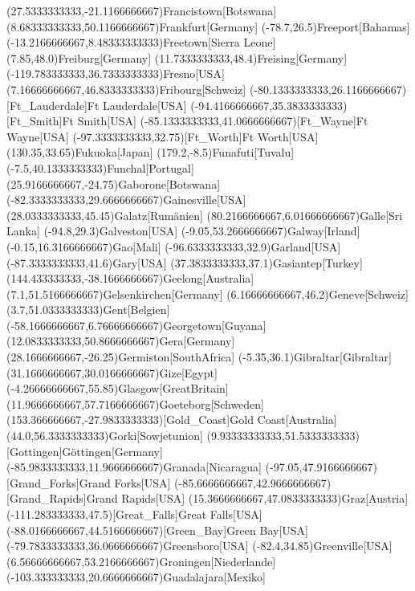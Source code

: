 \mapput(27.5333333333,-21.1166666667){Francistown}[Botswana]
\mapput(8.68333333333,50.1166666667){Frankfurt}[Germany]
\mapput(-78.7,26.5){Freeport}[Bahamas]
\mapput(-13.2166666667,8.48333333333){Freetown}[Sierra Leone]
\mapput(7.85,48.0){Freiburg}[Germany]
\mapput(11.7333333333,48.4){Freising}[Germany]
\mapput(-119.783333333,36.7333333333){Fresno}[USA]
\mapput(7.16666666667,46.8333333333){Fribourg}[Schweiz]
\mapput(-80.1333333333,26.1166666667)[Ft_Lauderdale]{Ft Lauderdale}[USA]
\mapput(-94.4166666667,35.3833333333)[Ft_Smith]{Ft Smith}[USA]
\mapput(-85.1333333333,41.0666666667)[Ft_Wayne]{Ft Wayne}[USA]
\mapput(-97.3333333333,32.75)[Ft_Worth]{Ft Worth}[USA]
\mapput(130.35,33.65){Fukuoka}[Japan]
\mapput(179.2,-8.5){Funafuti}[Tuvalu]
\mapput(-7.5,40.1333333333){Funchal}[Portugal]
\mapput(25.9166666667,-24.75){Gaborone}[Botswana]
\mapput(-82.3333333333,29.6666666667){Gainesville}[USA]
\mapput(28.0333333333,45.45){Galatz}[Rumänien]
\mapput(80.2166666667,6.01666666667){Galle}[Sri Lanka]
\mapput(-94.8,29.3){Galveston}[USA]
\mapput(-9.05,53.2666666667){Galway}[Irland]
\mapput(-0.15,16.3166666667){Gao}[Mali]
\mapput(-96.6333333333,32.9){Garland}[USA]
\mapput(-87.3333333333,41.6){Gary}[USA]
\mapput(37.3833333333,37.1){Gasiantep}[Turkey]
\mapput(144.433333333,-38.1666666667){Geelong}[Australia]
\mapput(7.1,51.5166666667){Gelsenkirchen}[Germany]
\mapput(6.16666666667,46.2){Geneve}[Schweiz]
\mapput(3.7,51.0333333333){Gent}[Belgien]
\mapput(-58.1666666667,6.76666666667){Georgetown}[Guyana]
\mapput(12.0833333333,50.8666666667){Gera}[Germany]
\mapput(28.1666666667,-26.25){Germiston}[SouthAfrica]
\mapput(-5.35,36.1){Gibraltar}[Gibraltar]
\mapput(31.1666666667,30.0166666667){Gize}[Egypt]
\mapput(-4.26666666667,55.85){Glasgow}[GreatBritain]
\mapput(11.9666666667,57.7166666667){Goeteborg}[Schweden]
\mapput(153.366666667,-27.9833333333)[Gold_Coast]{Gold Coast}[Australia]
\mapput(44.0,56.3333333333){Gorki}[Sowjetunion]
\mapput(9.93333333333,51.5333333333)[Gottingen]{Göttingen}[Germany]
\mapput(-85.9833333333,11.9666666667){Granada}[Nicaragua]
\mapput(-97.05,47.9166666667)[Grand_Forks]{Grand Forks}[USA]
\mapput(-85.6666666667,42.9666666667)[Grand_Rapids]{Grand Rapids}[USA]
\mapput(15.3666666667,47.0833333333){Graz}[Austria]
\mapput(-111.283333333,47.5)[Great_Falls]{Great Falls}[USA]
\mapput(-88.0166666667,44.5166666667)[Green_Bay]{Green Bay}[USA]
\mapput(-79.7833333333,36.0666666667){Greensboro}[USA]
\mapput(-82.4,34.85){Greenville}[USA]
\mapput(6.56666666667,53.2166666667){Groningen}[Niederlande]
\mapput(-103.333333333,20.6666666667){Guadalajara}[Mexiko]
